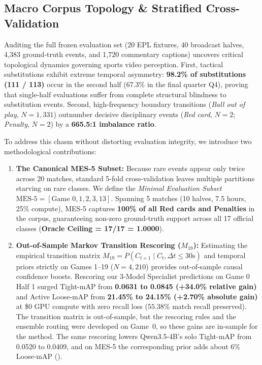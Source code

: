\documentclass[10pt,twocolumn,letterpaper]{article}
\begin{document}
\subsection{Macro Corpus Topology \& Stratified Cross-Validation}
Auditing the full frozen evaluation set (20 EPL fixtures, 40 broadcast halves, 4,383 ground-truth events, and 1,720 commentary captions) uncovers critical topological dynamics governing sports video perception. First, tactical substitutions exhibit extreme temporal asymmetry: \textbf{98.2\% of substitutions (111 / 113)} occur in the second half (67.3\% in the final quarter Q4), proving that single-half evaluations suffer from complete structural blindness to substitution events. Second, high-frequency boundary transitions (\textit{Ball out of play}, $N=1,331$) outnumber decisive disciplinary events (\textit{Red card}, $N=2$; \textit{Penalty}, $N=2$) by a \textbf{665.5:1 imbalance ratio}.

To address this chasm without distorting evaluation integrity, we introduce two methodological contributions:
\begin{enumerate}
    \item \textbf{The Canonical MES-5 Subset:} Because rare events appear only twice across 20 matches, standard 5-fold cross-validation leaves multiple partitions starving on rare classes. We define the \textit{Minimal Evaluation Subset} $\text{MES-5} = [\text{Game } 0, 1, 2, 3, 13]$. Spanning 5 matches (10 halves, 7.5 hours, 25\% compute), MES-5 captures \textbf{100\% of all Red cards and Penalties} in the corpus, guaranteeing non-zero ground-truth support across all 17 official classes (\textbf{Oracle Ceiling = 17/17 = 1.0000}).
    \item \textbf{Out-of-Sample Markov Transition Rescoring ($M_{19}$):} Estimating the empirical transition matrix $M_{19} = P(C_{t+1} \mid C_t, \Delta t \le 30\text{s})$ and temporal priors strictly on Games 1--19 ($N=4,210$) provides out-of-sample causal confidence boosts. Rescoring our 3-Model Specialist predictions on Game 0 Half 1 surged Tight-mAP from \textbf{0.0631 to 0.0845 (+34.0\% relative gain)} and Active Loose-mAP from \textbf{21.45\% to 24.15\% (+2.70\% absolute gain)} at \$0 GPU compute with zero recall loss ($55.38\%$ match recall preserved). The transition matrix is out-of-sample, but the rescoring rules and the ensemble routing were developed on Game~0, so these gains are in-sample for the method. The same rescoring lowers Qwen3.5-4B's solo Tight-mAP from 0.0520 to 0.0409, and on MES-5 the corresponding prior adds about 6\% Loose-mAP ().
\end{enumerate}
\end{document}
